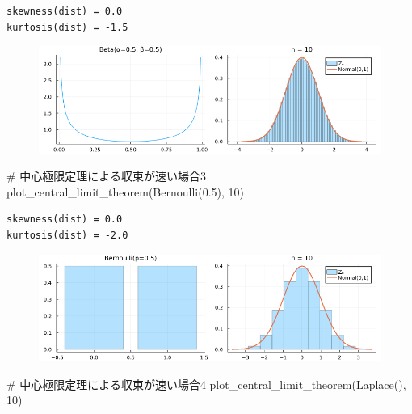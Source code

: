\documentclass[
  letterpaper,
  DIV=11,
  numbers=noendperiod]{scrartcl}
\newenvironment{Shaded}{\begin{snugshade}}{\end{snugshade}}
\newcommand{\CommentTok}[1]{\textcolor[rgb]{0.37,0.37,0.37}{#1}}
\newcommand{\FloatTok}[1]{\textcolor[rgb]{0.68,0.00,0.00}{#1}}
\newcommand{\FunctionTok}[1]{\textcolor[rgb]{0.28,0.35,0.67}{#1}}
\newcommand{\NormalTok}[1]{\textcolor[rgb]{0.00,0.23,0.31}{#1}}
\begin{document}
\begin{verbatim}
skewness(dist) = 0.0
kurtosis(dist) = -1.5
\end{verbatim}

\begin{figure}[H]

{\centering \includegraphics{05 Central limit theorem_files/figure-pdf/cell-75-output-2.png}

}

\end{figure}

\begin{Shaded}
\begin{Highlighting}[]
\CommentTok{\# 中心極限定理による収束が速い場合3}
\FunctionTok{plot\_central\_limit\_theorem}\NormalTok{(}\FunctionTok{Bernoulli}\NormalTok{(}\FloatTok{0.5}\NormalTok{), }\FloatTok{10}\NormalTok{)}
\end{Highlighting}
\end{Shaded}

\begin{verbatim}
skewness(dist) = 0.0
kurtosis(dist) = -2.0
\end{verbatim}

\begin{figure}[H]

{\centering \includegraphics{05 Central limit theorem_files/figure-pdf/cell-76-output-2.png}

}

\end{figure}

\begin{Shaded}
\begin{Highlighting}[]
\CommentTok{\# 中心極限定理による収束が速い場合4}
\FunctionTok{plot\_central\_limit\_theorem}\NormalTok{(}\FunctionTok{Laplace}\NormalTok{(), }\FloatTok{10}\NormalTok{)}
\end{Highlighting}
\end{Shaded}
\end{document}
